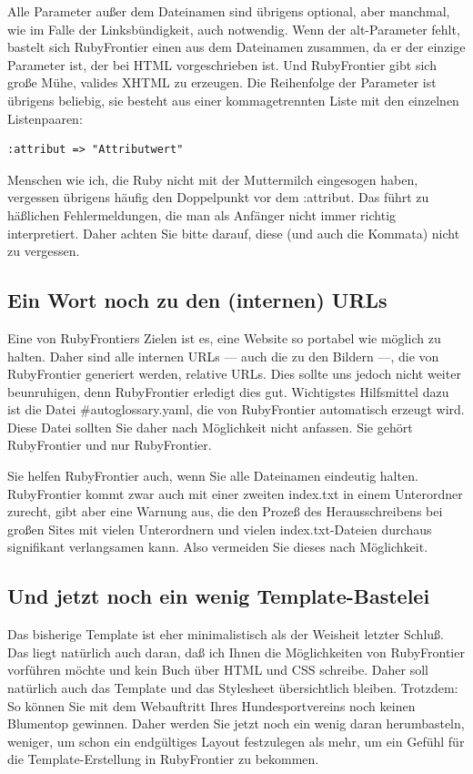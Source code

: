 \documentclass[11pt]{report}
\begin{document}
Alle Parameter außer dem Dateinamen sind übrigens optional, aber
manchmal, wie im Falle der Linksbündigkeit, auch notwendig. Wenn der
alt-Parameter fehlt, bastelt sich RubyFrontier einen aus dem
Dateinamen zusammen, da er der einzige Parameter ist, der bei HTML
vorgeschrieben ist. Und RubyFrontier gibt sich große Mühe, valides
XHTML zu erzeugen. Die Reihenfolge der Parameter ist übrigens
beliebig, sie besteht aus einer kommagetrennten Liste mit den
einzelnen Listenpaaren:


\begin{verbatim}
:attribut => "Attributwert"
\end{verbatim}

Menschen wie ich, die Ruby nicht mit der Muttermilch eingesogen haben,
vergessen übrigens häufig den Doppelpunkt vor dem :attribut. Das führt
zu häßlichen Fehlermeldungen, die man als Anfänger nicht immer richtig
interpretiert. Daher achten Sie bitte darauf, diese (und auch die
Kommata) nicht zu vergessen.
\subsection{Ein Wort noch zu den (internen) URLs}
\label{sec-2-1-1-4}


Eine von RubyFrontiers Zielen ist es, eine Website so portabel wie
möglich zu halten. Daher sind alle internen URLs — auch die zu den
Bildern —, die von RubyFrontier generiert werden, relative URLs. Dies
sollte uns jedoch nicht weiter beunruhigen, denn RubyFrontier erledigt
dies gut. Wichtigstes Hilfsmittel dazu ist die
Datei \#autoglossary.yaml, die von RubyFrontier automatisch erzeugt
wird. Diese Datei sollten Sie daher nach Möglichkeit nicht
anfassen. Sie gehört RubyFrontier und nur RubyFrontier.


Sie helfen RubyFrontier auch, wenn Sie alle Dateinamen eindeutig
halten. RubyFrontier kommt zwar auch mit einer zweiten index.txt in
einem Unterordner zurecht, gibt aber eine Warnung aus, die den Prozeß
des Herausschreibens bei großen Sites mit vielen Unterordnern und
vielen index.txt-Dateien durchaus signifikant verlangsamen kann. Also
vermeiden Sie dieses nach Möglichkeit.
\subsection{Und jetzt noch ein wenig Template-Bastelei}
\label{sec-2-1-1-5}


Das bisherige Template ist eher minimalistisch als der Weisheit
letzter Schluß. Das liegt natürlich auch daran, daß ich Ihnen die
Möglichkeiten von RubyFrontier vorführen möchte und kein Buch über
HTML und CSS schreibe. Daher soll natürlich auch das Template und das
Stylesheet übersichtlich bleiben. Trotzdem: So können Sie mit dem
Webauftritt Ihres Hundesportvereins noch keinen Blumentop
gewinnen. Daher werden Sie jetzt noch ein wenig daran herumbasteln,
weniger, um schon ein endgültiges Layout festzulegen als mehr, um ein
Gefühl für die Template-Erstellung in RubyFrontier zu bekommen.
\end{document}
